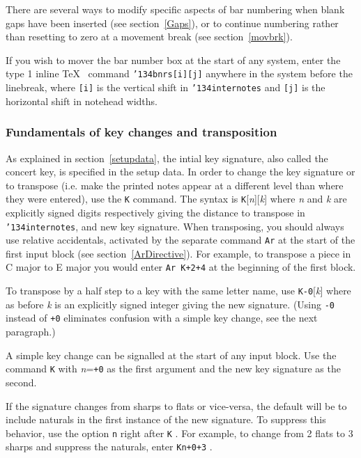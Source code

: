 \documentclass[11pt]{article}
\def\bs{{\tt\char'134}}
\def\newfrom{2.59}  %
\def\NEW#1{\ifdim#1 pt<\newfrom pt\else%
\marginpar{\fbox{#1}}\fi}
\begin{document}
	There are several ways to modify specific aspects of bar numbering 
when blank gaps have been inserted (see section~\ref{Gaps}), or to continue 
numbering rather than resetting to zero at a movement break
(see section~\ref{movbrk}).

	If you wish to mover the bar number box at the start of any system, 
enter the type 1 inline \TeX~ command {\tt\bs bnrs[i][j]} anywhere in the
system before the linebreak, where {\tt [i]} is the vertical shift in 
{\tt \bs internotes} and {\tt [j]} is the horizontal shift in notehead
widths.

\subsubsection{Fundamentals of key changes and transposition}\label{transpose}

As explained in section~\ref{setupdata}, the intial key signature, also called
the concert key, is specified in the setup data. In order to change the key
signature or to transpose (i.e. make the printed notes appear at a different 
level than where 
they were entered), use the {\tt K} command. The syntax is {\tt K}[{\it n}][{\it k}] 
where {\it n} and {\it k} are explicitly signed digits respectively giving the distance 
to transpose in \bs{\tt internotes}, and 
new key signature. When transposing, you should always use relative accidentals, activated by
the separate command {\tt Ar} at the start of the first input block (see section~\ref{ArDirective}). 
For example, to transpose a piece in C major to E major you would enter 
{\tt Ar~K+2+4} at the beginning of the first block. 

To transpose by a half step to a key with the same
letter name, use {\tt K-0}[{\it k}] where as before {\it k} is an explicitly signed integer giving
the new signature. 
(Using {\tt -0} instead of {\tt +0} eliminates confusion with a simple key 
change, see the next paragraph.)

A simple key change can be signalled at the start of any input block. Use
the command {\tt K} with {\it n}={\tt +0} as the first argument and the new key signature as the second.

If the signature changes from sharps to flats
or vice-versa, the default will be to include naturals in the first instance of the new
signature. To suppress this behavior, use the \NEW{2.7}option {\tt n} right after {\tt K} .
For example, to change from
2 flats to 3 sharps and suppress the naturals, enter {\tt Kn+0+3} .
\end{document}
